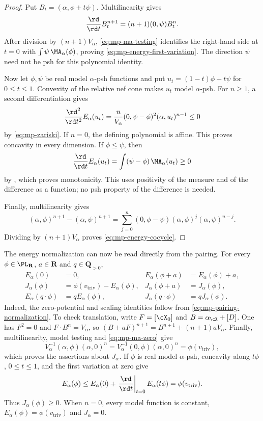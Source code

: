 \begin{proof}
Put $B_t=(\alpha,\phi+t\psi)$.  Multilinearity gives
\[
 \frac{\rd}{\rd t}B_t^{n+1}
      =(n+1)(0,\psi)B_t^n.
\]
After division by $(n+1)V_\alpha$,
\eqref{eq:mp-ma-testing} identifies the right-hand side at $t=0$ with
$\int\psi\,\MA_\alpha(\phi)$, proving
\eqref{eq:mp-energy-first-variation}.  The direction $\psi$ need not
be psh for this polynomial identity.

Now let $\phi,\psi$ be real model $\alpha$-psh functions and put
$u_t=(1-t)\phi+t\psi$ for $0\leq t\leq1$.
Convexity of the relative nef cone makes $u_t$ model $\alpha$-psh.
For $n\geq1$, a second differentiation gives
\[
 \frac{\rd^2}{\rd t^2}E_\alpha(u_t)
   =\frac{n}{V_\alpha}(0,\psi-\phi)^2(\alpha,u_t)^{n-1}\leq0
\]
by \eqref{eq:mp-zariski}.  If $n=0$, the defining polynomial is affine.
This proves concavity in every dimension.  If $\phi\leq\psi$, then
\[
 \frac{\rd}{\rd t}E_\alpha(u_t)
   =\int(\psi-\phi)\,\MA_\alpha(u_t)\geq0
\]
by , which proves monotonicity.  This
uses positivity of the measure and of the difference as a function;
no psh property of the difference is needed.

Finally, multilinearity gives
\[
 (\alpha,\phi)^{n+1}-(\alpha,\psi)^{n+1}
 =\sum_{j=0}^n
   (0,\phi-\psi)(\alpha,\phi)^j(\alpha,\psi)^{n-j}.
\]
Dividing by $(n+1)V_\alpha$ proves
\eqref{eq:mp-energy-cocycle}.
\end{proof}

The energy normalization can now be read directly from the pairing. For every $\phi\in\PL_{\mathbf R}$, $a\in\mathbf R$ and $q\in\mathbf Q_{>0}$,
\[
 \begin{aligned}
 E_\alpha(0)&=0,& E_\alpha(\phi+a)&=E_\alpha(\phi)+a,\\
 J_\alpha(\phi)&=\phi(v_{\mathrm{triv}})-E_\alpha(\phi),&
 J_\alpha(\phi+a)&=J_\alpha(\phi),\\
 E_\alpha(q\cdot\phi)&=qE_\alpha(\phi),&
 J_\alpha(q\cdot\phi)&=qJ_\alpha(\phi).
 \end{aligned}
\tag{60.15a}\label{eq:mp-energy-normalization}
\]
Indeed, the zero-potential and scaling identities follow from \eqref{eq:mp-pairing-normalization}. To check translation, write $F=[\cX_0]$ and $B=\alpha_{\cX}+[D]$. One has $F^2=0$ and $F\cdot B^n=V_\alpha$, so $(B+aF)^{n+1}=B^{n+1}+(n+1)aV_\alpha$. Finally, multilinearity, model testing and \eqref{eq:mp-ma-zero} give
\[
 V_\alpha^{-1}(\alpha,\phi)(\alpha,0)^n
 =V_\alpha^{-1}(0,\phi)(\alpha,0)^n
 =\phi(v_{\mathrm{triv}}),
\]
which proves the assertions about $J_\alpha$. If $\phi$ is real model $\alpha$-psh, concavity along $t\phi$, $0\leq t\leq1$, and the first variation at zero give
\[
 E_\alpha(\phi)\leq E_\alpha(0)
   +\left.\frac{\rd}{\rd t}\right|_{t=0}E_\alpha(t\phi)
 =\phi(v_{\mathrm{triv}}).
\]
Thus $J_\alpha(\phi)\geq0$. When $n=0$, every model function is constant, $E_\alpha(\phi)=\phi(v_{\mathrm{triv}})$ and $J_\alpha=0$.


